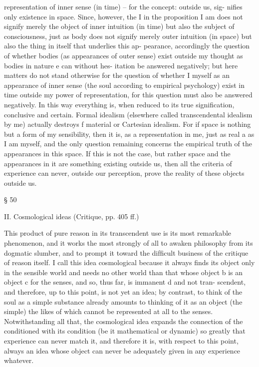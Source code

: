 representation of inner sense (in time) – for the concept: outside us, sig-
niﬁes only existence in space. Since, however, the I in the proposition
I am does not signify merely the object of inner intuition (in time) but
also the subject of consciousness, just as body does not signify merely
outer intuition (in space) but also the thing in itself that underlies this ap-
pearance, accordingly the question of whether bodies (as appearances of
outer sense) exist outside my thought as bodies in nature e can without hes-
itation be answered negatively; but here matters do not stand otherwise
for the question of whether I myself as an appearance of inner sense (the
soul according to empirical psychology) exist in time outside my power
of representation, for this question must also be answered negatively. In
this way everything is, when reduced to its true signiﬁcation, conclusive
and certain. Formal idealism (elsewhere called transcendental idealism
by me) actually destroys f material or Cartesian idealism. For if space is
nothing but a form of my sensibility, then it is, as a representation in me,
just as real a as I am myself, and the only question remaining concerns
the empirical truth of the appearances in this space. If this is not the case,
but rather space and the appearances in it are something existing outside
us, then all the criteria of experience can never, outside our perception,
prove the reality of these objects outside us.

§ 50

II. Cosmological ideas (Critique, pp. 405 ff.)

This product of pure reason in its transcendent use is its most remarkable
phenomenon, and it works the most strongly of all to awaken philosophy
from its dogmatic slumber, and to prompt it toward the difﬁcult business
of the critique of reason itself.
I call this idea cosmological because it always ﬁnds its object only in
the sensible world and needs no other world than that whose object b is
an object c for the senses, and so, thus far, is immanent d and not tran-
scendent, and therefore, up to this point, is not yet an idea; by contrast,
to think of the soul as a simple substance already amounts to thinking of
it as an object (the simple) the likes of which cannot be represented at all
to the senses. Notwithstanding all that, the cosmological idea expands
the connection of the conditioned with its condition (be it mathematical
or dynamic) so greatly that experience can never match it, and therefore
it is, with respect to this point, always an idea whose object can never be
adequately given in any experience whatever.

